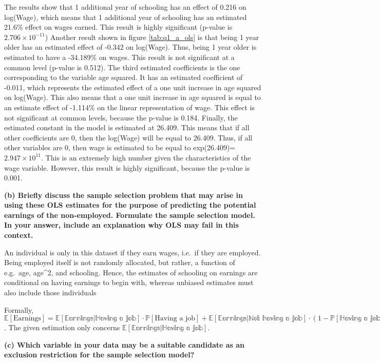\documentclass[
]{article}
\begin{document}
The results show that 1 additional year of schooling has an effect of
0.216 on log(Wage), which means that 1 additional year of schooling has
an estimated 21.6\% effect on wages earned. This result is highly
significant (p-value is \ensuremath{2.706\times 10^{-11}}) Another
result shown in figure \ref{tab:q1_a_ols} is that being 1 year older has
an estimated effect of -0.342 on log(Wage). Thus, being 1 year older is
estimated to have a -34.189\% on wages. This result is not significant
at a common level (p-value is 0.512). The third estimated coefficients
is the one corresponding to the variable age squared. It has an
estimated coefficient of -0.011, which represents the estimated effect
of a one unit increase in age squared on log(Wage). This also means that
a one unit increase in age squared is equal to an estimate effect of
-1.114\% on the linear representation of wage. This effect is not
significant at common levels, because the p-value is 0.184. Finally, the
estimated constant in the model is estimated at 26.409. This means that
if all other coefficients are 0, then the log(Wage) will be equal to
26.409. Thus, if all other variables are 0, then wage is estimated to be
equal to exp(26.409)=\ensuremath{2.947\times 10^{11}}. This is an
extremely high number given the characteristics of the wage variable.
However, this result is highly significant, because the p-value is
0.001.

\textbf{(b) Briefly discuss the sample selection problem that may arise
in using these OLS estimates for the purpose of predicting the potential
earnings of the non-employed. Formulate the sample selection model. In
your answer, include an explanation why OLS may fail in this context.}

An individual is only in this dataset if they earn wages, i.e.~if they
are employed. Being employed itself is not randomly allocated, but
rather, a function of e.g.~age, age\^{}2, and schooling. Hence, the
estimates of schooling on earnings are conditional on having earnings to
begin with, whereas unbiased estimates must also include those
individuals

Formally,
\(\mathbb{E}[\text{Earnings}] = \mathbb{E[\text{Earnings}|\text{Having a job}]} \cdot \mathbb{P}[\text{Having a job}] + \mathbb{E[\text{Earnings}|\text{Not having a job}]} \cdot (1-\mathbb{P[\text{Having a job}]})\).
The given estimation only concerns
\(\mathbb{E[\text{Earnings}|\text{Having a job}]}\).

\textbf{(c) Which variable in your data may be a suitable candidate as
an exclusion restriction for the sample selection model?}
\end{document}

